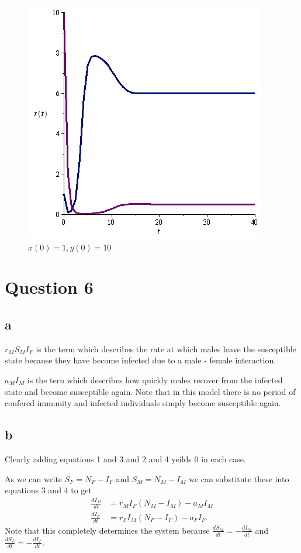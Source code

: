 \documentclass{unswmaths}
\begin{document}
\begin{figure}[H]
    \includegraphics[scale=0.5]{pp_1_10}
    \caption{$x(0)=1,y(0)=10$}
\end{figure}
\section*{Question 6}
\subsection*{a}
$ r_MS_MI_F $ is the term which describes the rate at which males leave the susceptible state because they have become infected due to a male - female interaction.

$ a_MI_M $ is the tern which describes how quickly males recover from the infected state and become susceptible again. Note that in this model there is no period of confered immunity and infected individuals simply become susceptible again.

\subsection*{b}
Clearly adding equations 1 and 3 and 2 and 4 yeilds 0 in each case. 

As we can write $ S_F = N_F - I_F $ and $ S_M = N_M - I_M $ we can substitute these into equations 3 and 4 to get
\begin{align*}
    \frac{dI_M}{dt} &= r_MI_F(N_M-I_M)-a_MI_M \\
    \frac{dI_F}{dt} &= r_FI_M(N_F - I_F) - a_FI_F.
\end{align*}
Note that this completely determines the system because $ \frac{dS_M}{dt} = -\frac{dI_M}{dt} $ and  $ \frac{dS_F}{dt} = -\frac{dI_F}{dt} $.
\end{document}
